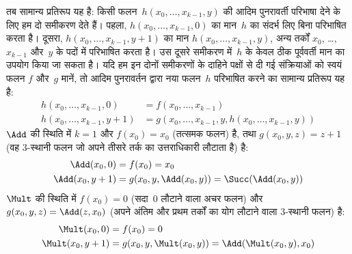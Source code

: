 \documentclass[../../../include/open-logic-section]{subfiles}
\begin{document}
तब सामान्य प्रतिरूप यह है: किसी फलन~$h(x_0, \dots, x_{k-1}, y)$ की
आदिम पुनरावर्ती परिभाषा देने के लिए हम दो समीकरण देते हैं। पहला,
$h(x_0, \dots, x_{k-1}, 0)$ का मान~$h$ का संदर्भ लिए बिना परिभाषित करता है।
दूसरा, $h(x_0,
\dots, x_{k-1}, y+1)$ का मान
$h(x_0, \dots, x_{k-1}, y)$, अन्य तर्कों $x_0$,
\dots,~$x_{k-1}$ और~$y$ के पदों में परिभाषित करता है। उस दूसरे समीकरण
में~$h$ के केवल ठीक पूर्ववर्ती मान
का उपयोग किया जा सकता है। यदि हम इन दोनों समीकरणों के दाहिने पक्षों से
दी गई संक्रियाओं को स्वयं फलन $f$ और~$g$ मानें, तो आदिम पुनरावर्तन द्वारा
नया फलन~$h$ परिभाषित करने का सामान्य प्रतिरूप यह है:
\begin{align*}
  h(x_0, \dots, x_{k-1}, 0) & = f(x_0, \dots, x_{k-1})\\
  h(x_0, \dots, x_{k-1}, y+1) & =
  g(x_0, \dots, x_{k-1}, y, h(x_0, \dots, x_{k-1}, y))
\end{align*}  
$\Add$ की स्थिति में $k=1$ और $f(x_0) = x_0$ (तत्समक फलन) है, तथा
$g(x_0, y, z) = z + 1$ (वह $3$-स्थानी फलन जो अपने तीसरे तर्क का
उत्तराधिकारी लौटाता है) है:
\begin{align*}
  \Add(x_0, 0) & = f(x_0) = x_0\\
  \Add(x_0, y+1) & = g(x_0, y, \Add(x_0, y)) =
  \Succ(\Add(x_0, y))
\end{align*}
$\Mult$ की स्थिति में $f(x_0) = 0$ (सदा~$0$ लौटाने वाला अचर फलन) और
$g(x_0, y, z) = \Add(z,x_0)$ (अपने अंतिम और प्रथम तर्कों का योग लौटाने
वाला $3$-स्थानी फलन) है:
\begin{align*}
  \Mult(x_0,0) & =  f(x_0) = 0 \\
  \Mult(x_0,y+1) & =  g(x_0, y, \Mult(x_0,y)) =
  \Add(\Mult(x_0,y), x_0)
\end{align*}
\end{document}
